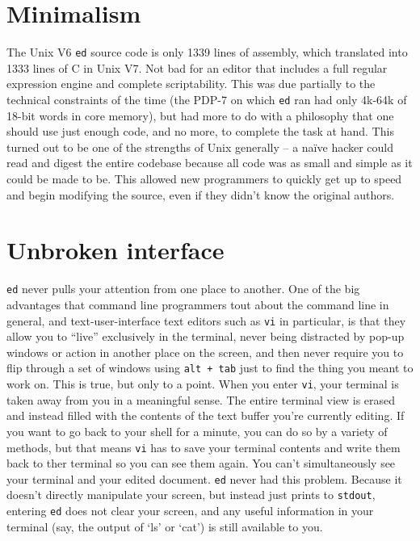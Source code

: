 \documentclass[12pt]{article}
\begin{document}
\section{Minimalism}

The Unix V6 \lstinline{ed} source code is only 1339 lines of assembly, which translated into 1333 lines of C in Unix V7.
Not bad for an editor that includes a full regular expression engine
and complete scriptability. This was due partially to the technical constraints
of the time (the PDP-7 on which \lstinline{ed} ran had only 4k-64k of 18-bit words in core memory),
but had more to do with a philosophy that one should use just enough code,
and no more, to complete the task at hand. This turned out to be one of the
strengths of Unix generally -- a naïve hacker could read and digest the entire
codebase because all code was as small and simple as it could be made to be. This allowed
new programmers to quickly get up to speed and begin modifying the source, even
if they didn't know the original authors.

\section{Unbroken interface}

\lstinline{ed} never pulls your attention from one place to another.
One of the big advantages that command line programmers tout about
the command line in general, and text-user-interface text editors
such as \lstinline{vi} in particular, is that they allow you to
``live'' exclusively in the terminal, never being distracted
by pop-up windows or action in another place on the screen,
and then never require you to flip through a set of windows using
\lstinline{alt + tab} just to find the thing you meant to work on.
This is true, but only to a point. When you enter \lstinline{vi},
your terminal is taken away from you in a meaningful sense. The entire
terminal view is erased and instead filled with the contents of the
text buffer you're currently editing. If you want to go back to your shell
for a minute, you can do so by a variety of methods, but that means
\lstinline{vi} has to save your terminal contents and write them
back to ther terminal so you can see them again. You can't simultaneously
see your terminal and your edited document. \lstinline{ed} never had
this problem. Because it doesn't directly manipulate your
screen, but instead just prints to \lstinline{stdout}, entering
\lstinline{ed} does not clear your screen, and any useful
information in your terminal (say, the output of `ls' or `cat')
is still available to you.
\end{document}
